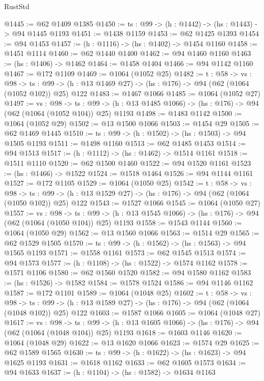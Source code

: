 \begin{lexlean}{RustStd}
\begin{coremodule}
@1445 := @62 @1409 @1385
@1450 := {ts : @99} -> (h : @1442) -> (hs : @1443) -> @94 @1445 @1193
@1451 := @1438 @1159
@1453 := @62 @1425 @1393
@1454 := @94 @1453
@1457 := (h : @1116) -> (hs : @1402) -> @1454 @1160
@1458 := @1451 @1114
@1460 := @62 @1440 @1400
@1462 := @94 @1460 @1160
@1463 := (hs : @1406) -> @1462
@1464 := @1458 @1404
@1466 := @94 @1142 @1160
@1467 := @172 @1109
@1469 := @1064 (@1052 @25)
@1482 := {t : @58} ->
  {vs : @98} ->
  {ts : @99} -> (h : @13 @1469 @27) -> (hs : @176) -> @94 (@62 (@1064 (@1052 @102)) @25) @122
@1483 := @1467 @1066
@1485 := @1064 (@1052 @27)
@1497 := {vs : @98} ->
  {ts : @99} -> (h : @13 @1485 @1066) -> (hs : @176) -> @94 (@62 (@1064 (@1052 @104)) @25) @1193
@1498 := @1483 @1142
@1500 := @1064 (@1052 @29)
@1502 := @13 @1500 @1066
@1503 := @1454 @29
@1505 := @62 @1469 @1445
@1510 := {ts : @99} -> (h : @1502) -> (hs : @1503) -> @94 @1505 @1193
@1511 := @1498 @1160
@1513 := @62 @1485 @1453
@1514 := @94 @1513
@1517 := (h : @1112) -> (hs : @1462) -> @1514 @1161
@1518 := @1511 @1110
@1520 := @62 @1500 @1460
@1522 := @94 @1520 @1161
@1523 := (hs : @1466) -> @1522
@1524 := @1518 @1464
@1526 := @94 @1144 @1161
@1527 := @172 @1105
@1529 := @1064 (@1050 @25)
@1542 := {t : @58} ->
  {vs : @98} ->
  {ts : @99} -> (h : @13 @1529 @27) -> (hs : @176) -> @94 (@62 (@1064 (@1050 @102)) @25) @122
@1543 := @1527 @1066
@1545 := @1064 (@1050 @27)
@1557 := {vs : @98} ->
  {ts : @99} -> (h : @13 @1545 @1066) -> (hs : @176) -> @94 (@62 (@1064 (@1050 @104)) @25) @1193
@1558 := @1543 @1144
@1560 := @1064 (@1050 @29)
@1562 := @13 @1560 @1066
@1563 := @1514 @29
@1565 := @62 @1529 @1505
@1570 := {ts : @99} -> (h : @1562) -> (hs : @1563) -> @94 @1565 @1193
@1571 := @1558 @1161
@1573 := @62 @1545 @1513
@1574 := @94 @1573
@1577 := (h : @1108) -> (hs : @1522) -> @1574 @1162
@1578 := @1571 @1106
@1580 := @62 @1560 @1520
@1582 := @94 @1580 @1162
@1583 := (hs : @1526) -> @1582
@1584 := @1578 @1524
@1586 := @94 @1146 @1162
@1587 := @172 @1101
@1589 := @1064 (@1048 @25)
@1602 := {t : @58} ->
  {vs : @98} ->
  {ts : @99} -> (h : @13 @1589 @27) -> (hs : @176) -> @94 (@62 (@1064 (@1048 @102)) @25) @122
@1603 := @1587 @1066
@1605 := @1064 (@1048 @27)
@1617 := {vs : @98} ->
  {ts : @99} -> (h : @13 @1605 @1066) -> (hs : @176) -> @94 (@62 (@1064 (@1048 @104)) @25) @1193
@1618 := @1603 @1146
@1620 := @1064 (@1048 @29)
@1622 := @13 @1620 @1066
@1623 := @1574 @29
@1625 := @62 @1589 @1565
@1630 := {ts : @99} -> (h : @1622) -> (hs : @1623) -> @94 @1625 @1193
@1631 := @1618 @1162
@1633 := @62 @1605 @1573
@1634 := @94 @1633
@1637 := (h : @1104) -> (hs : @1582) -> @1634 @1163

\end{coremodule}
\end{lexlean}
